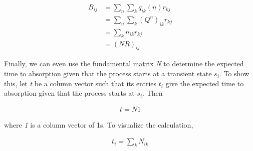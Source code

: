 \documentclass[a4paper, 12pt]{article}
\begin{document}
	\begin{equation*}
	\begin{aligned}
		 B_{ij} &= \sum_{n} \sum_{k} q_{ik}(n)r_{kj} \\
		 		&= \sum_{n} \sum_{k} (Q^n)_{ik} r_{kj} \\
		 		&= \sum_{k} n_{ik}r_{kj} \\
		 		&= (NR)_{ij}

	\end{aligned}
	\end{equation*}

Finally, we can even use the fundamental matrix \textit{N} to determine the expected time to absorption given that the process starts at a transient state $s_i$. To show this, let \textit{t} be a column vector such that its entries $t_i$ give the expected time to absorption given that the process starts at $s_i$. Then

	\begin{equation*}
	\begin{aligned}
		 t = N1
	\end{aligned}
	\end{equation*}
	
where \textit{1} is a column vector of 1s. To visualize the calculation,

	\begin{equation*}
	\begin{aligned}
		 t_i = \sum_{k} N_{ik}
	\end{aligned}
	\end{equation*}
	
\end{document}
